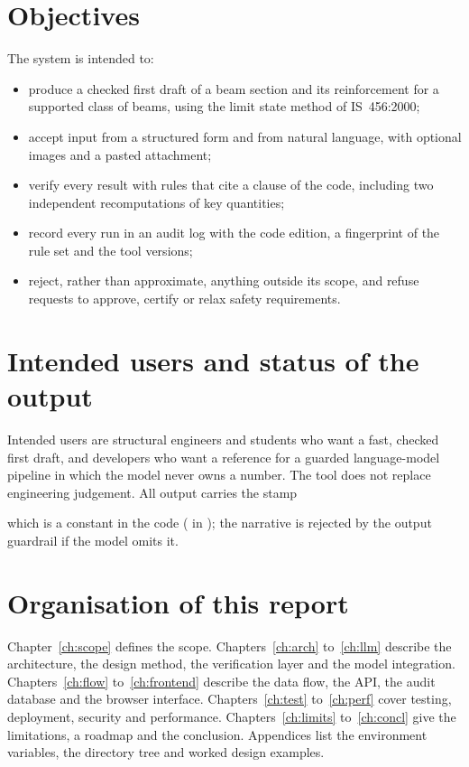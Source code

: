 \section{Objectives}
The system is intended to:
\begin{itemize}
  \item produce a checked first draft of a beam section and its reinforcement for a supported class of beams, using the limit state method of IS~456:2000;
  \item accept input from a structured form and from natural language, with optional images and a pasted attachment;
  \item verify every result with rules that cite a clause of the code, including two independent recomputations of key quantities;
  \item record every run in an audit log with the code edition, a fingerprint of the rule set and the tool versions;
  \item reject, rather than approximate, anything outside its scope, and refuse requests to approve, certify or relax safety requirements.
\end{itemize}

\section{Intended users and status of the output}
Intended users are structural engineers and students who want a fast, checked first draft, and developers who want a reference for a guarded language-model pipeline in which the model never owns a number. The tool does not replace engineering judgement. All output carries the stamp
\begin{quote}\small\textbf{\stamp}\end{quote}
which is a constant in the code ( in ); the narrative is rejected by the output guardrail if the model omits it.

\section{Organisation of this report}
Chapter~\ref{ch:scope} defines the scope. Chapters~\ref{ch:arch} to~\ref{ch:llm} describe the architecture, the design method, the verification layer and the model integration. Chapters~\ref{ch:flow} to~\ref{ch:frontend} describe the data flow, the API, the audit database and the browser interface. Chapters~\ref{ch:test} to~\ref{ch:perf} cover testing, deployment, security and performance. Chapters~\ref{ch:limits} to~\ref{ch:concl} give the limitations, a roadmap and the conclusion. Appendices list the environment variables, the directory tree and worked design examples.
